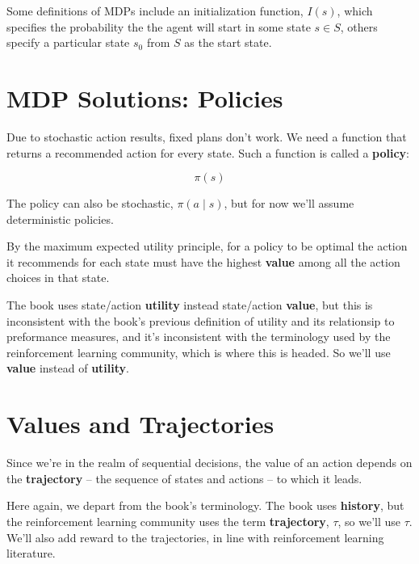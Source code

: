 \documentclass[11pt]{article}
\renewenvironment{quote}{\begin{shaded*}\begin{oldquote}}{\end{oldquote}\end{shaded*}}
\begin{document}
Some definitions of MDPs include an initialization function, \(I(s)\), which specifies the probability the the agent will start in some state \(s \in S\), others specify a particular state \(s_0\) from \(S\) as the start state.
\section{MDP Solutions: Policies}
\label{sec:orgbd72963}

Due to stochastic action results, fixed plans don't work.  We need a function that returns a recommended action for every state.  Such a function is called a \textbf{policy}:

\begin{equation*}
\pi(s)
\end{equation*}

The policy can also be stochastic, \(\pi(a \mid s)\), but for now we'll assume deterministic policies.

By the maximum expected utility principle, for a policy to be optimal the action it recommends for each state must have the highest \textbf{value} among all the action choices in that state.

\begin{quote}
The book uses state/action \textbf{utility} instead state/action \textbf{value}, but this is inconsistent with the book's previous definition of utility and its relationsip to preformance measures, and it's inconsistent with the terminology used by the reinforcement learning community, which is where this is headed.  So we'll use \textbf{value} instead of \textbf{utility}.
\end{quote}
\section{Values and Trajectories}
\label{sec:org1254b20}

Since we're in the realm of sequential decisions, the value of an action depends on the \textbf{trajectory} -- the sequence of states and actions -- to which it leads.

\begin{quote}
Here again, we depart from the book's terminology.  The book uses \textbf{history}, but the reinforcement learning community uses the term \textbf{trajectory}, \(\tau\), so we'll use \(\tau\).  We'll also add reward to the trajectories, in line with reinforcement learning literature.
\end{quote}
\end{document}

